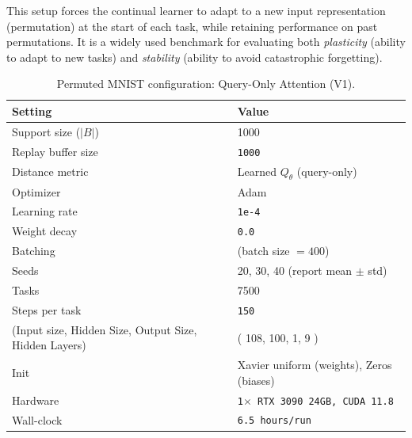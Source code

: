 \documentclass{article}
\begin{document}
This setup forces the continual learner to adapt to a new input representation (permutation) at the start of each task, while retaining performance on past permutations. It is a widely used benchmark for evaluating both \textit{plasticity} (ability to adapt to new tasks) and \textit{stability} (ability to avoid catastrophic forgetting).

 
\begin{table}[H]
\centering
\footnotesize
\caption{Permuted MNIST configuration: Query-Only Attention (V1).}
\label{tab:pmnist_query_only_attention_v1}
\begin{tabular}{@{}ll@{}}
\toprule
Setting & Value \\ \midrule
Support size ($|B|$) & 1000 \\
Replay buffer size & \texttt{1000} \\
Distance metric & Learned $Q_{\theta}$ (query-only) \\
Optimizer & Adam \\
Learning rate & \texttt{1e-4} \\
Weight decay & \texttt{0.0} \\
Batching & (batch size $=400$) \\
Seeds & 20, 30, 40 (report mean $\pm$ std) \\
Tasks & 7500 \\
Steps per task & \texttt{150} \\
(Input size, Hidden Size, Output Size, Hidden Layers) & ( 108, 100, 1, 9 ) \\ 
Init & Xavier uniform (weights), Zeros (biases) \\
Hardware & \texttt{1$\times$ RTX 3090 24GB, CUDA 11.8} \\
Wall-clock & \texttt{6.5 hours/run} \\
\bottomrule
\end{tabular}
\end{table}
\end{document}
